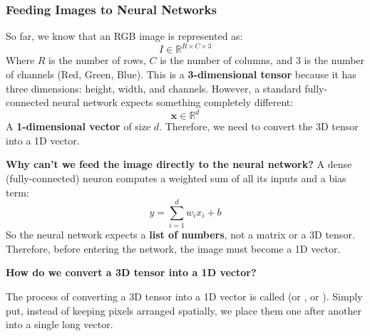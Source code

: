 \subsubsection{Feeding Images to Neural Networks}\label{sec:feeding-images-to-neural-networks}

So far, we know that an RGB image is represented as:
\begin{equation*}
    I \in \mathbb{R}^{R \times C \times 3}
\end{equation*}
Where $R$ is the number of rows, $C$ is the number of columns, and $3$ is the number of channels (Red, Green, Blue). This is a \textbf{3-dimensional tensor} because it has three dimensions: height, width, and channels. However, a standard fully-connected neural network expects something completely different:
\begin{equation*}
    \mathbf{x} \in \mathbb{R}^{d}
\end{equation*}
A \textbf{1-dimensional vector} of size $d$. Therefore, we need to convert the 3D tensor into a 1D vector.

\highspace
\textcolor{Green3}{ \textbf{Why can't we feed the image directly to the neural network?}} A dense (fully-connected) neuron computes a weighted sum of all its inputs and a bias term:
\begin{equation*}
    y = \sum_{i=1}^{d} w_i x_i + b
\end{equation*}
So the neural network expects a \textbf{list of numbers}, not a matrix or a 3D tensor. Therefore, before entering the network, the image must become a 1D vector.

\highspace
\begin{flushleft}
    \textcolor{Green3}{ \textbf{How do we convert a 3D tensor into a 1D vector?}}
\end{flushleft}
The process of converting a 3D tensor into a 1D vector is called  (or , or ). Simply put, instead of keeping pixels arranged spatially, we place them one after another into a single long vector.

